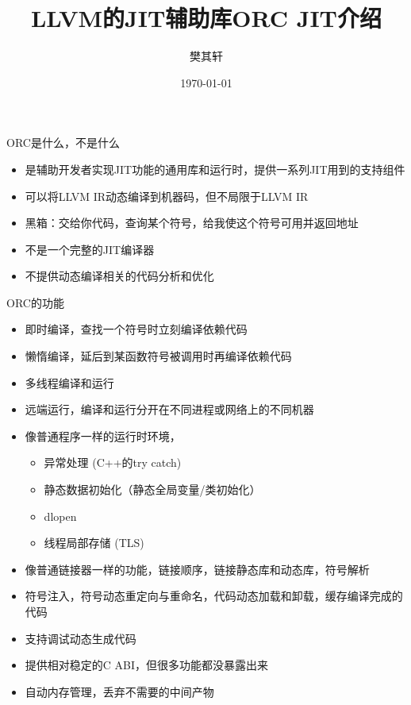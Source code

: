 \documentclass[
  8pt,
  ignorenonframetext,
  aspectratio=169]{beamer}
\title{LLVM的JIT辅助库ORC JIT介绍}
\author{樊其轩}
\date{\today}
\providecommand{\tightlist}{%
  \setlength{\itemsep}{0pt}\setlength{\parskip}{0pt}}
\begin{document}
\frame{\titlepage}

\begin{frame}{ORC是什么，不是什么}
\protect\hypertarget{orcux662fux4ec0ux4e48ux4e0dux662fux4ec0ux4e48}{}
\begin{block}{}
\protect\hypertarget{section}{}
\begin{itemize}
\tightlist
\item
  是辅助开发者实现JIT功能的通用库和运行时，提供一系列JIT用到的支持组件
\item
  可以将LLVM IR动态编译到机器码，但不局限于LLVM IR
\item
  黑箱：交给你代码，查询某个符号，给我使这个符号可用并返回地址
\end{itemize}
\end{block}

\begin{block}{}
\protect\hypertarget{section-1}{}
\begin{itemize}
\tightlist
\item
  不是一个完整的JIT编译器
\item
  不提供动态编译相关的代码分析和优化
\end{itemize}
\end{block}
\end{frame}

\begin{frame}{ORC的功能}
\protect\hypertarget{orcux7684ux529fux80fd}{}
\begin{itemize}
\tightlist
\item
  即时编译，查找一个符号时立刻编译依赖代码
\item
  懒惰编译，延后到某函数符号被调用时再编译依赖代码
\item
  多线程编译和运行
\item
  远端运行，编译和运行分开在不同进程或网络上的不同机器
\item
  像普通程序一样的运行时环境，

  \begin{itemize}
  \tightlist
  \item
    异常处理 (C++的try catch)
  \item
    静态数据初始化（静态全局变量/类初始化）
  \item
    dlopen
  \item
    线程局部存储 (TLS)
  \end{itemize}
\item
  像普通链接器一样的功能，链接顺序，链接静态库和动态库，符号解析
\item
  符号注入，符号动态重定向与重命名，代码动态加载和卸载，缓存编译完成的代码
\item
  支持调试动态生成代码
\item
  提供相对稳定的C ABI，但很多功能都没暴露出来
\item
  自动内存管理，丢弃不需要的中间产物
\end{itemize}
\end{frame}
\end{document}

